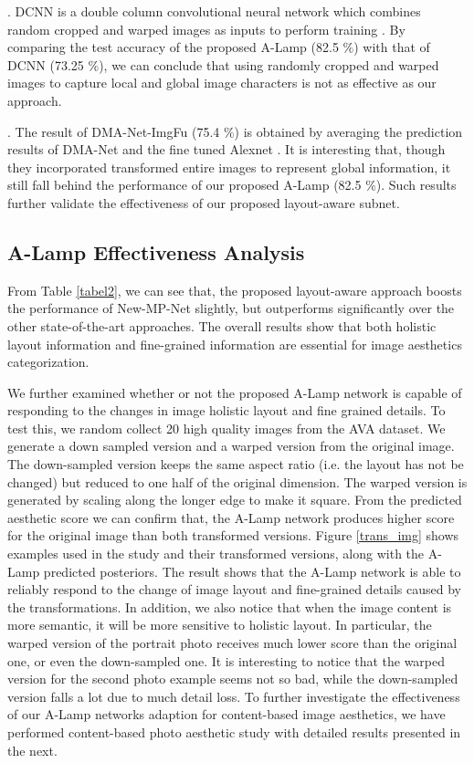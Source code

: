 \documentclass[10pt,twocolumn,letterpaper]{article}
\begin{document}
	. DCNN \cite{Lu:2014:TMM:rating} is a double column convolutional neural network which combines random cropped and warped images as inputs to perform training . By comparing the test accuracy of the proposed A-Lamp (82.5 $\%$) with that of DCNN (73.25 $\%$), we can conclude that using randomly cropped and warped images to capture local and global image characters is not as effective as our approach.
	
	. The result of DMA-Net-ImgFu (75.4 $\%$) \cite{Lu:2015:ICCV} is obtained by averaging the prediction results of DMA-Net and the fine tuned Alexnet \cite{Alex:2012:NIPS:ImageNet}. It is interesting that, though they incorporated transformed entire images to represent global information, it still fall behind the performance of our proposed A-Lamp (82.5 $\%$). Such results further validate the effectiveness of our proposed layout-aware subnet. 
	
	
	\subsection{A-Lamp Effectiveness Analysis}
	From Table \ref{tabel2}, we can see that, the proposed layout-aware approach boosts the performance of New-MP-Net slightly, but outperforms significantly over the other state-of-the-art approaches. The overall results show that both holistic layout information and fine-grained information are essential for image aesthetics categorization. 


	We further examined whether or not the proposed A-Lamp network is capable of responding to the changes in image holistic layout and fine grained details. To test this, we random collect 20 high quality images from the AVA dataset. We generate a down sampled version and a warped version from the original image. The down-sampled version keeps the same aspect ratio (i.e. the layout has not be changed) but reduced to one half of the original dimension. The warped version is generated by scaling along the longer edge to make it square. From the predicted aesthetic score we can confirm that, the A-Lamp network produces higher score for the original image than both transformed versions. Figure \ref{trans_img} shows examples used in the study and their transformed versions, along with the A-Lamp predicted posteriors. The result shows that the A-Lamp network is able to reliably respond to the change of image layout and fine-grained details caused by the transformations. 
	In addition, we also notice that when the image content is more semantic, it will be more sensitive to holistic layout. In particular, the warped version of the portrait photo receives much lower score than the original one, or even the down-sampled one. It is interesting to notice that the warped version for the second photo example seems not so bad, while the down-sampled version falls a lot due to much detail loss. To further investigate the effectiveness of our A-Lamp networks adaption for content-based image aesthetics, we have performed content-based photo aesthetic study with detailed results presented in the next.
	
\end{document}
